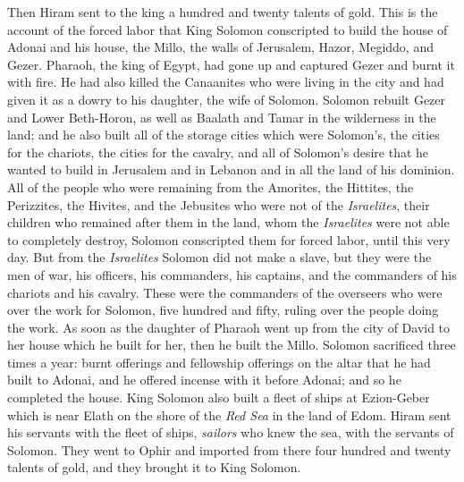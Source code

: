 \begin{biblechapter}
\verse Then Hiram sent to the king a hundred and twenty talents of gold.
 This is the account of the forced labor that King Solomon conscripted to build the house of Adonai and his house, the Millo, the walls of Jerusalem, Hazor, Megiddo, and Gezer.
\verse Pharaoh, the king of Egypt, had gone up and captured Gezer and burnt it with fire. He had also killed the Canaanites who were living in the city and had given it as a dowry to his daughter, the wife of Solomon.
\verse Solomon rebuilt Gezer and Lower Beth-Horon,
\verse as well as Baalath and Tamar in the wilderness in the land;
\verse and he also built all of the storage cities which were Solomon’s, the cities for the chariots, the cities for the cavalry, and all of Solomon’s desire that he wanted to build in Jerusalem and in Lebanon and in all the land of his dominion.
\verse All of the people who were remaining from the Amorites, the Hittites, the Perizzites, the Hivites, and the Jebusites who were not of the \textit{Israelites},
\verse their children who remained after them in the land, whom the \textit{Israelites} were not able to completely destroy, Solomon conscripted them for forced labor, until this very day.
\verse But from the \textit{Israelites} Solomon did not make a slave, but they were the men of war, his officers, his commanders, his captains, and the commanders of his chariots and his cavalry.
\verse These were the commanders of the overseers who were over the work for Solomon, five hundred and fifty, ruling over the people doing the work.
\verse As soon as the daughter of Pharaoh went up from the city of David to her house which he built for her, then he built the Millo.
\verse Solomon sacrificed three times a year: burnt offerings and fellowship offerings on the altar that he had built to Adonai, and he offered incense with it before Adonai; and so he completed the house.
\verse King Solomon also built a fleet of ships at Ezion-Geber which is near Elath on the shore of the \textit{Red Sea} in the land of Edom.
\verse Hiram sent his servants with the fleet of ships, \textit{sailors} who knew the sea, with the servants of Solomon.
\verse They went to Ophir and imported from there four hundred and twenty talents of gold, and they brought it to King Solomon.
\end{biblechapter}

